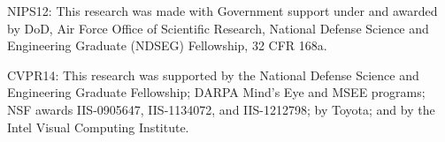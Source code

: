 \begin{acknowledgements}

NIPS12:
This research was made with Government support under and awarded by DoD, Air Force Office of Scientific Research, National Defense Science and Engineering Graduate (NDSEG) Fellowship, 32 CFR 168a.

CVPR14:
This research was supported by the National Defense Science and Engineering Graduate Fellowship; DARPA Mind's Eye and MSEE programs; NSF awards IIS-0905647, IIS-1134072, and IIS-1212798; by Toyota; and by the Intel Visual Computing Institute.
\end{acknowledgements}
